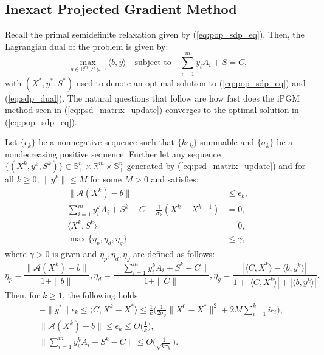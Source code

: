 \documentclass[12pt]{l4dc2021}
\begin{document}
        \subsection{Inexact Projected Gradient Method} \label{sec:ipgm_main}
        Recall the primal semidefinite relaxation given by (\ref{eq:pop_sdp_eq}). Then, the Lagrangian dual of the problem is given by:
        \begin{equation} \label{eq:sdp_dual}
            \max_{y \in \mathbb{R}^m, S \succeq 0} \langle b, y \rangle \quad \text{subject to} \quad \sum_{i=1}^{m}y_iA_i+S=C,
        \end{equation}
        with $(X^*,y^*,S^*)$ used to denote an optimal solution to (\ref{eq:pop_sdp_eq}) and (\ref{eq:sdp_dual}). The natural questions that follow are how fast does the iPGM method seen in (\ref{eq:psd_matrix_update}) converges to the optimal solution in (\ref{eq:pop_sdp_eq}).
        \begin{theorem} \label{thm:ipgm}
            Let $\{ \epsilon_k \}$ be a nonnegative sequence such that $\{ k\epsilon_k \}$ summable and $\{ \sigma_k \}$ be a nondecreasing positive sequence. Further let any sequence $\{ (X^k,y^k,S^k) \} \in \mathbb{S}_+^n \times \mathbb{R}^m \times \mathbb{S}_+^n$ generated by (\ref{eq:psd_matrix_update}) and for all $k\ge 0$, $\|y^k\| \le M$ for some $M>0$ and satisfies: 
            \begin{align}
                \| \mathcal{A}(X^k) - b \| & \le \epsilon_k, \label{eq:ipgm_conditons1} \\
                \sum_{i=1}^m y_i^kA_i + S^k - C - \frac{1}{\sigma_k}(X^k - X^{k-1}) & = 0, \\
                \langle X^k, S^k \rangle & = 0, \label{eq:ipgm_conditons3}\\
                \max \{ \eta_p, \eta_d, \eta_g\} & \le \gamma, \nonumber
            \end{align}
            where $\gamma > 0$ is given and $\eta_p,\eta_d,\eta_g$ are defined as follows:
            \begin{equation} \label{eq:stop_criterion}
                \eta_p = \frac{\| \mathcal{A}(X^k) -b \|}{1 + \|b\|}, \eta_d= \frac{\|\sum_{i=1}^m y_i^kA_i + S^k - C\|}{1 + \|C\|}, \eta_g = \frac{|\langle C, X^k \rangle - \langle b, y^k\rangle|}{1 + |\langle C, X^k \rangle| + |\langle b, y^k\rangle|}.
            \end{equation}
            Then, for $k \ge 1$, the following holds:
            \begin{align*}
                &-\| y^* \| \epsilon_k \le \langle C, X^k - X^* \rangle \le \frac{1}{k} \Bigg(\frac{1}{2\sigma_0} \|X^0 - X^* \|^2 + 2M \sum_{i=1}^k i\epsilon_i\Bigg), \\
                &\| \mathcal{A}(X^k) - b\| \le \epsilon_k \le O\Big(\frac{1}{k}\Big), \\
                &\Big\|\sum_{i=1}^my_i^kA_i + S^k - C\Big\| \le O\Bigg(\frac{1}{\sqrt{k\sigma_k}}\Bigg).
            \end{align*}
        \end{theorem}
\end{document}
